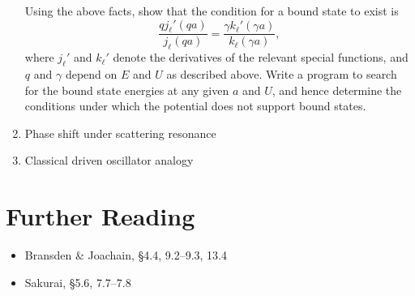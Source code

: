 \documentclass[pra,12pt]{revtex4}
\begin{document}
\begin{enumerate}
  Using the above facts, show that the condition for a bound state to
  exist is
  $$\frac{qj_\ell'(qa)}{j_\ell(qa)} = \frac{\gamma k_\ell'(\gamma a)}{k_\ell(\gamma a)},$$
  where $j_\ell'$ and $k_\ell'$ denote the derivatives of the relevant
  special functions, and $q$ and $\gamma$ depend on $E$ and $U$ as
  described above.  Write a program to search for the bound state
  energies at any given $a$ and $U$, and hence determine the
  conditions under which the potential does not support bound
  states.



\label{ex:boundstate3d}

\item Phase shift under scattering resonance

\item Classical driven oscillator analogy  
\end{enumerate}




\section*{Further Reading}

\begin{itemize}
\item Bransden \& Joachain, \S4.4, 9.2--9.3, 13.4
\item Sakurai, \S5.6, 7.7--7.8

\end{itemize}
\end{document}
